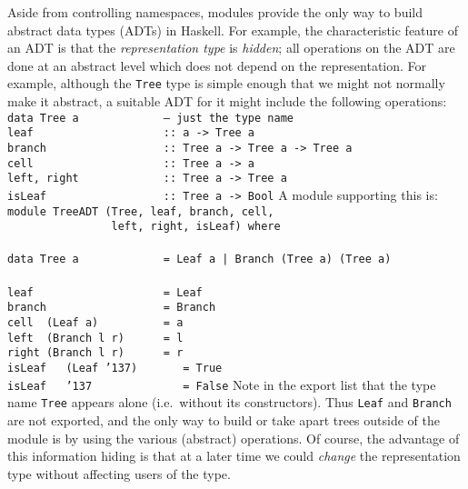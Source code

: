 Aside from controlling namespaces, modules provide the only way to
build abstract data types (ADTs) in Haskell.  For example, the
characteristic feature of an ADT is that the {\em representation type}
is {\em hidden}; all operations on the ADT are done at an abstract
level which does not depend on the representation.  For example,
although the \mbox{\tt Tree} type is simple enough that we might not normally
make it abstract, a suitable ADT for it might include the following
operations:
\bprog
\mbox{\tt data\ Tree\ a\ \ \ \ \ \ \ \ \ \ \ \ \ --\ just\ the\ type\ name\ }\\
\mbox{\tt leaf\ \ \ \ \ \ \ \ \ \ \ \ \ \ \ \ \ \ \ \ ::\ a\ ->\ Tree\ a}\\
\mbox{\tt branch\ \ \ \ \ \ \ \ \ \ \ \ \ \ \ \ \ \ ::\ Tree\ a\ ->\ Tree\ a\ ->\ Tree\ a}\\
\mbox{\tt cell\ \ \ \ \ \ \ \ \ \ \ \ \ \ \ \ \ \ \ \ ::\ Tree\ a\ ->\ a}\\
\mbox{\tt left,\ right\ \ \ \ \ \ \ \ \ \ \ \ \ ::\ Tree\ a\ ->\ Tree\ a}\\
\mbox{\tt isLeaf\ \ \ \ \ \ \ \ \ \ \ \ \ \ \ \ \ \ ::\ Tree\ a\ ->\ Bool}
\eprog 
A module supporting this is:
\bprog
\mbox{\tt module\ TreeADT\ (Tree,\ leaf,\ branch,\ cell,\ }\\
\mbox{\tt \ \ \ \ \ \ \ \ \ \ \ \ \ \ \ \ left,\ right,\ isLeaf)\ where}\\
\mbox{\tt }\\[-8pt]
\mbox{\tt data\ Tree\ a\ \ \ \ \ \ \ \ \ \ \ \ \ =\ Leaf\ a\ |\ Branch\ (Tree\ a)\ (Tree\ a)\ }\\
\mbox{\tt }\\[-8pt]
\mbox{\tt leaf\ \ \ \ \ \ \ \ \ \ \ \ \ \ \ \ \ \ \ \ =\ Leaf}\\
\mbox{\tt branch\ \ \ \ \ \ \ \ \ \ \ \ \ \ \ \ \ \ =\ Branch}\\
\mbox{\tt cell\ \ (Leaf\ a)\ \ \ \ \ \ \ \ \ \ =\ a}\\
\mbox{\tt left\ \ (Branch\ l\ r)\ \ \ \ \ \ =\ l}\\
\mbox{\tt right\ (Branch\ l\ r)\ \ \ \ \ \ =\ r}\\
\mbox{\tt isLeaf\ \ \ (Leaf\ {\char'137})\ \ \ \ \ \ \ =\ True}\\
\mbox{\tt isLeaf\ \ \ {\char'137}\ \ \ \ \ \ \ \ \ \ \ \ \ \ =\ False}
\eprog 
Note in the export list that the type name \mbox{\tt Tree} appears alone
(i.e.~without its constructors).  Thus
\mbox{\tt Leaf} and \mbox{\tt Branch} are not exported, and the only way to build or
take apart trees outside of the module is by using the various
(abstract) operations.  Of course, the advantage of this information
hiding is that at a later time we could {\em change} the
representation type without affecting users of the type.

